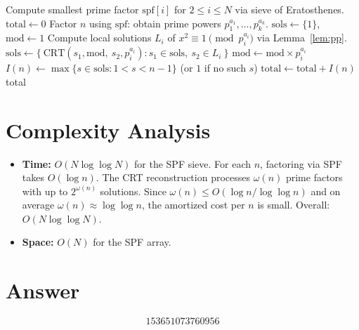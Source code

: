 \documentclass[12pt,a4paper]{article}
\begin{document}
\begin{algorithm}[H]
\caption{Compute $\sum I(n)$ via SPF sieve and CRT}
\begin{algorithmic}[1]
\State Compute smallest prime factor $\text{spf}[i]$ for $2 \le i \le N$ via sieve of Eratosthenes.
\State $\text{total} \gets 0$
    \State Factor $n$ using $\text{spf}$: obtain prime powers $p_1^{a_1}, \ldots, p_k^{a_k}$.
    \State $\text{sols} \gets \{1\}$, $\text{mod} \gets 1$
        \State Compute local solutions $L_i$ of $x^2 \equiv 1 \pmod{p_i^{a_i}}$ via Lemma~\ref{lem:pp}.
        \State $\text{sols} \gets \{\ \text{CRT}(s_1, \text{mod},\ s_2, p_i^{a_i}) : s_1 \in \text{sols},\ s_2 \in L_i\ \}$
        \State $\text{mod} \gets \text{mod} \times p_i^{a_i}$
    \EndFor
    \State $I(n) \gets \max\{s \in \text{sols} : 1 < s < n-1\}$ (or $1$ if no such $s$)
    \State $\text{total} \gets \text{total} + I(n)$
\EndFor
\State \Return total
\end{algorithmic}
\end{algorithm}

\section{Complexity Analysis}

\begin{itemize}
    \item \textbf{Time:} $O(N \log \log N)$ for the SPF sieve. For each $n$, factoring via SPF takes $O(\log n)$. The CRT reconstruction processes $\omega(n)$ prime factors with up to $2^{\omega(n)}$ solutions. Since $\omega(n) \le O(\log n / \log \log n)$ and on average $\omega(n) \approx \log \log n$, the amortized cost per $n$ is small. Overall: $O(N \log \log N)$.
    \item \textbf{Space:} $O(N)$ for the SPF array.
\end{itemize}

\section{Answer}

\[
\boxed{153651073760956}
\]
\end{document}
